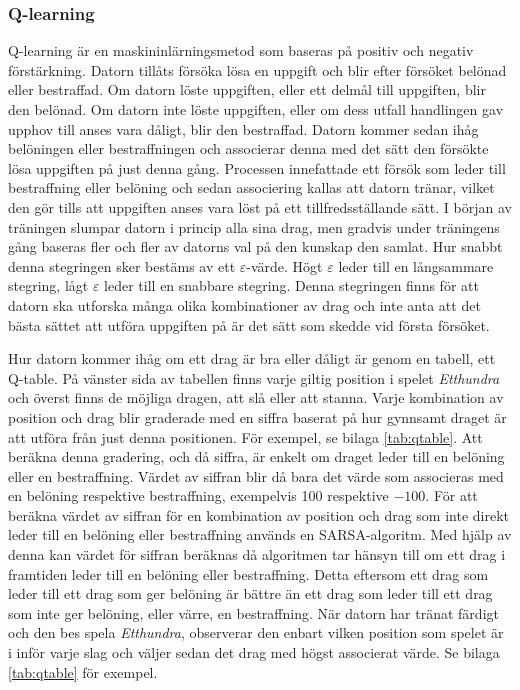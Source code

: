 \documentclass[12pt,a4paper]{article}
\begin{document}
      \subsubsection{Q-learning}\label{subsubsec:qlearning} 
        Q-learning är en maskininlärningsmetod som baseras på positiv och negativ förstärkning. Datorn tillåts försöka lösa en uppgift och blir efter försöket belönad eller bestraffad. Om datorn löste uppgiften, eller ett delmål till uppgiften, blir den belönad. Om datorn inte löste uppgiften, eller om dess utfall handlingen gav upphov till anses vara dåligt, blir den bestraffad. Datorn kommer sedan ihåg belöningen eller bestraffningen och associerar denna med det sätt den försökte lösa uppgiften på just denna gång. Processen innefattade ett försök som leder till bestraffning eller belöning och sedan associering kallas att datorn tränar, vilket den gör tills att uppgiften anses vara löst på ett tillfredsställande sätt. I början av träningen slumpar datorn i princip alla sina drag, men gradvis under träningens gång baseras fler och fler av datorns val på den kunskap den samlat. Hur snabbt denna stegringen sker bestäms av ett $\varepsilon$-värde. Högt $\varepsilon$ leder till en långsammare stegring, lågt $\varepsilon$ leder till en snabbare stegring. Denna stegringen finns för att datorn ska utforska många olika kombinationer av drag och inte anta att det bästa sättet att utföra uppgiften på är det sätt som skedde vid första försöket.
        
        Hur datorn kommer ihåg om ett drag är bra eller dåligt är genom en tabell, ett Q-table. På vänster sida av tabellen finns varje giltig position i spelet \emph{Etthundra} och överst finns de möjliga dragen, att slå eller att stanna. Varje kombination av position och drag blir graderade med en siffra baserat på hur gynnsamt draget är att utföra från just denna positionen. För exempel, se bilaga \ref{tab:qtable}. Att beräkna denna gradering, och då siffra, är enkelt om draget leder till en belöning eller en bestraffning. Värdet av siffran blir då bara det värde som associeras med en belöning respektive bestraffning, exempelvis 100 respektive $-100$. För att beräkna värdet av siffran för en kombination av position och drag som inte direkt leder till en belöning eller bestraffning används en SARSA-algoritm. Med hjälp av denna kan värdet för siffran beräknas då algoritmen tar hänsyn till om ett drag i framtiden leder till en belöning eller bestraffning. Detta eftersom ett drag som leder till ett drag som ger belöning är bättre än ett drag som leder till ett drag som inte ger belöning, eller värre, en bestraffning. När datorn har tränat färdigt och den bes spela \emph{Etthundra}, observerar den enbart vilken position som spelet är i inför varje slag och väljer sedan det drag med högst associerat värde. Se bilaga \ref{tab:qtable} för exempel.
\end{document}
